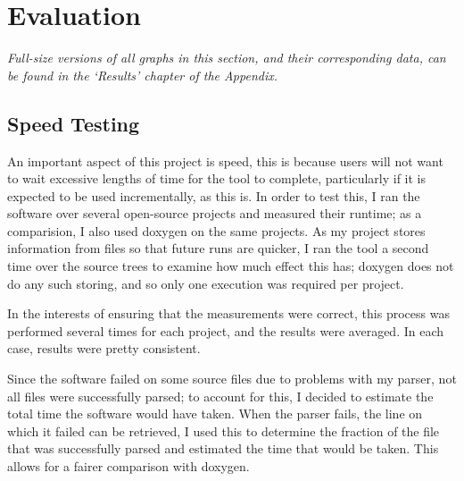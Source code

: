 



\chapter{Evaluation}
\emph{Full-size versions of all graphs in this section, and their corresponding
data, can be found in the `Results' chapter of the Appendix.}

\section{Speed Testing}
An important aspect of this project is speed, this is because users will not
want to wait excessive lengths of time for the tool to complete, particularly if
it is expected to be used incrementally, as this is. In order to test this, I
ran the software over several open-source projects and measured their runtime;
as a comparision, I also used doxygen on the same projects. As my project stores
information from files so that future runs are quicker, I ran the tool a second
time over the source trees to examine how much effect this has; doxygen does not
do any such storing, and so only one execution was required per project.

In the interests of ensuring that the measurements were correct, this process
was performed several times for each project, and the results were averaged. In
each case, results were pretty consistent.

Since the software failed on some source files due to problems with my parser,
not all files were successfully parsed; to account for this, I decided to
estimate the total time the software would have taken. When the parser fails,
the line on which it failed can be retrieved, I used this to determine the
fraction of the file that was successfully parsed and estimated the time that
would be taken. This allows for a fairer comparison with doxygen.

